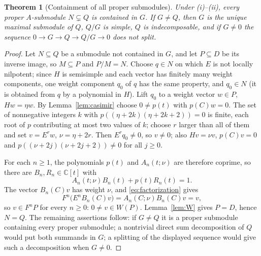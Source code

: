 \documentclass[11pt,a4paper]{article}
\newcommand{\C}{\mathbb C}
\newtheorem{theorem}{Theorem}[section]
\begin{document}
\begin{theorem}[Containment of all proper submodules]
\label{thm:containment}
Under (i)--(ii), every proper $A$-submodule $N\subsetneq Q$ is contained in
$G$. If $G\ne Q$, then $G$ is the unique maximal submodule of $Q$, $Q/G$ is
simple, $Q$ is indecomposable, and if $G\ne0$ the sequence
$0\to G\to Q\to Q/G\to0$ does not split.
\end{theorem}
\begin{proof}
Let $N\subseteq Q$ be a submodule not contained in $G$, and let
$P\subseteq D$ be its inverse image, so $M\subseteq P$ and $P/M=N$. Choose
$q\in N$ on which $E$ is not locally nilpotent; since $H$ is semisimple and
each vector has finitely many weight components, one weight component $q_0$
of $q$ has the same property, and $q_0\in N$ (it is obtained from $q$ by a
polynomial in $H$). Lift $q_0$ to a weight vector $w\in P$, $Hw=\eta w$. By
Lemma~\ref{lem:casimir} choose $0\ne p(t)$ with $p(C)w=0$. The set of
nonnegative integers $k$ with $p((\eta+2k)(\eta+2k+2))=0$ is finite, each
root of $p$ contributing at most two values of $k$; choose $r$ larger than
all of them and set $v=E^rw$, $\nu=\eta+2r$. Then $E^rq_0\ne0$, so
$v\ne0$; also $Hv=\nu v$, $p(C)v=0$ and
$p((\nu+2j)(\nu+2j+2))\ne0$ for all $j\ge0$.

For each $n\ge1$, the polynomials $p(t)$ and $A_n(t;\nu)$ are therefore
coprime, so there are $B_n,R_n\in\C[t]$ with
\[
 A_n(t;\nu)B_n(t)+p(t)R_n(t)=1.
\]
The vector $B_n(C)v$ has weight $\nu$, and
\eqref{eq:factorization} gives
\[
 F^n\bigl(E^nB_n(C)v\bigr)=A_n(C;\nu)B_n(C)v=v,
\]
so $v\in F^nP$ for every $n\ge0$: $0\ne v\in W(P)$. Lemma~\ref{lem:W}
gives $P=D$, hence $N=Q$. The remaining assertions follow: if $G\ne Q$ it
is a proper submodule containing every proper submodule; a nontrivial
direct sum decomposition of $Q$ would put both summands in $G$; a splitting
of the displayed sequence would give such a decomposition when $G\ne0$.
\end{proof}
\end{document}

